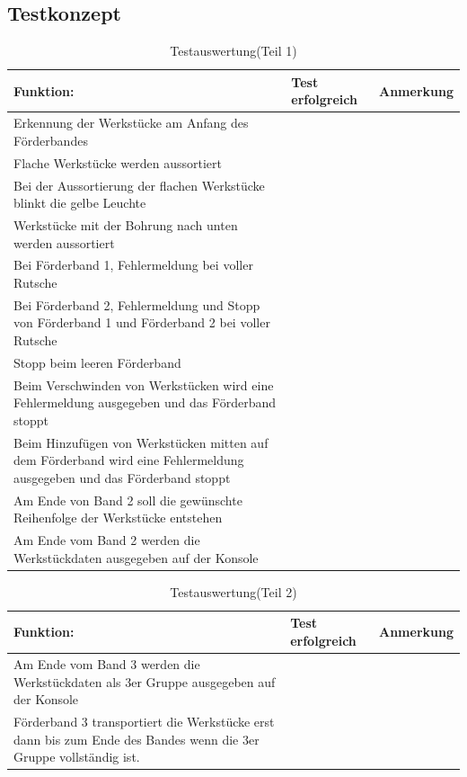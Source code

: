 \documentclass[a4paper, 11pt]{article}
\begin{document}
\subsection{Testkonzept}
\begin{table}[h]
\center
\begin{tabularx}{\textwidth}{|X|X|X|}
\hline
\textbf{Funktion:}&\textbf{Test erfolgreich}&\textbf{Anmerkung}\\
\hline
Erkennung der Werkstücke am Anfang des Förderbandes&&\\
\hline
Flache Werkstücke werden aussortiert&&\\
\hline
Bei der Aussortierung der flachen Werkstücke blinkt die gelbe Leuchte&&\\
\hline
Werkstücke mit der Bohrung nach unten werden aussortiert&&\\
\hline
Bei Förderband 1, Fehlermeldung bei voller Rutsche&&\\
\hline
Bei Förderband 2, Fehlermeldung und Stopp von Förderband 1 und Förderband 2 bei voller Rutsche&&\\
\hline
Stopp beim leeren Förderband&&\\
\hline
Beim Verschwinden von Werkstücken wird eine Fehlermeldung ausgegeben und das Förderband stoppt&&\\
\hline
Beim Hinzufügen von Werkstücken mitten auf dem Förderband wird eine Fehlermeldung ausgegeben und das Förderband stoppt&&\\
\hline
Am Ende von Band 2 soll die gewünschte Reihenfolge der Werkstücke entstehen&&\\
\hline
Am Ende vom Band 2 werden die Werkstückdaten ausgegeben auf der Konsole&&\\
\hline
\end{tabularx}
\caption{Testauswertung(Teil 1)}
\label{tst1}
\end{table}

\newpage

\begin{table}[h]
\center
\begin{tabularx}{\textwidth}{|X|X|X|}
\hline
\textbf{Funktion:}&\textbf{Test erfolgreich}&\textbf{Anmerkung}\\
\hline
Am Ende vom Band 3 werden die Werkstückdaten als 3er Gruppe ausgegeben auf der Konsole&&\\
\hline
Förderband 3 transportiert die Werkstücke erst dann bis zum Ende des Bandes wenn die 3er Gruppe vollständig ist.&&\\
\hline
\end{tabularx}
\caption{Testauswertung(Teil 2)}
\label{tst2}
\end{table}
\end{document}
